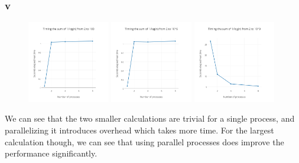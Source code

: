 \subsubsection*{v}
\begin{figure}[h]
    \centering
    \includegraphics[width=0.32\textwidth]{10^2.png}
    \includegraphics[width=0.32\textwidth]{10^6.png}
    \includegraphics[width=0.32\textwidth]{10^9.png}
    \caption*{}
\end{figure}
We can see that the two smaller calculations are trivial for a single process,
and parallelizing it introduces overhead which takes more time.
For the largest calculation though, we can see that using parallel processes does improve the performance significantly.

